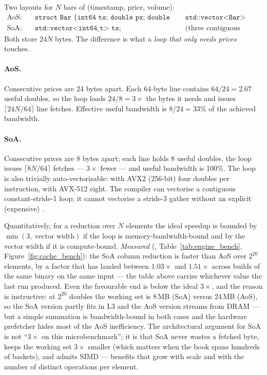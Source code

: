 Two layouts for $N$ bars of (timestamp, price, volume):
\begin{align}
  \text{AoS:}\quad & \texttt{struct Bar \{ int64 ts; double px; double vol; \};}
  && \texttt{std::vector<Bar> bars;} \label{eq:aos}\\
  \text{SoA:}\quad & \texttt{std::vector<int64\_t> ts; std::vector<double> px, vol;}
  && \text{(three contiguous columns)} \label{eq:soa}
\end{align}
Both store $24N$ bytes. The difference is what a \emph{loop that only needs prices}
touches.

\paragraph{AoS.} Consecutive prices are 24 bytes apart. Each 64-byte line contains
$64/24 = 2.67$ useful doubles, so the loop loads $24/8 = 3\times$ the bytes it needs and
issues $\lceil 24N/64\rceil$ line fetches. Effective useful bandwidth is $8/24=33\%$ of
the achieved bandwidth.

\paragraph{SoA.} Consecutive prices are 8 bytes apart; each line holds 8 useful doubles,
the loop issues $\lceil 8N/64\rceil$ fetches --- $3\times$ fewer --- and useful bandwidth
is 100\%. The loop is also trivially auto-vectorisable: with AVX2 (256-bit) four doubles
per instruction, with AVX-512 eight. The compiler can vectorise a contiguous
constant-stride-1 loop; it cannot vectorise a stride-3 gather without an explicit
(expensive) .

Quantitatively, for a reduction over $N$ elements the ideal speedup is bounded by
$\min(3,\ \text{vector width})$ if the loop is memory-bandwidth-bound and by the vector
width if it is compute-bound. \emph{Measured} (,
Table~\ref{tab:engine_bench}, Figure~\ref{fig:cache_bench}): the SoA column reduction is
faster than AoS over $2^{20}$ elements, by a factor that has landed between $1.03\times$
and $1.51\times$ across builds of the same binary on the same input --- the table above
carries whichever value the last run produced. Even the favourable end is below the ideal
$3\times$, and the reason is instructive: at $2^{20}$ doubles the working set is 8\,MB
(SoA) versus 24\,MB (AoS), so the SoA version partly fits in L3 and the AoS version
streams from DRAM --- but a simple summation is bandwidth-bound in both cases and the
hardware prefetcher hides most of the AoS inefficiency. The architectural argument for
SoA is not ``$3\times$ on this microbenchmark''; it is that SoA never wastes a fetched
byte, keeps the working set $3\times$ smaller (which matters when the book spans hundreds
of baskets), and admits SIMD --- benefits that grow with scale and with the number of
distinct operations per element.

